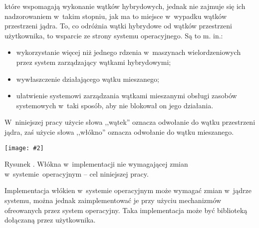 \documentclass[12pt]{mwart}
\newcounter{figmain}
\newcommand{\myownfigure}[4]{ \newcounter{#1} \setcounter{#1}{\value{figmain}} \addtocounter{figmain}{1} \begin{center} \label{fig:#1} \centering \texttt{[image: \#2]}\\ \nopagebreak[5] \parbox[t]{11.5cm}{Rysunek \arabic{#1}. #3.} \end{center}}
\begin{document}
  które wspomagają wykonanie wątków hybrydowych, jednak nie zajmuje się ich nadzorowaniem w~takim stopniu, jak ma to miejsce w~wypadku
  wątków przestrzeni jądra. To, co odróżnia wątki hybrydowe od wątków przestrzeni użytkownika, to wsparcie ze strony systemu operacyjnego.
  Są to m. in.:
  \begin{itemize}
    \item wykorzystanie więcej niż jednego rdzenia w~maszynach wielordzeniowych przez system zarządzający wątkami hybrydowymi;
    \item wywłaszczenie działającego wątku mieszanego;
    \item ułatwienie systemowi zarządzania wątkami mieszanymi obsługi zasobów systemowych w~taki sposób, aby nie blokował on jego działania.
  \end{itemize}
\par
%
\indent
  W~niniejszej pracy użycie słowa ,,wątek'' oznacza odwołanie do wątku przestrzeni jądra, zaś użycie słowa ,,włókno'' oznacza odwołanie
  do wątku mieszanego.
\par
%
\indent
  \myownfigure{mixedintro}{mixedscheme.png}{Włókna w~implementacji nie wymagającej zmian w~systemie~operacyjnym -- cel niniejszej pracy}{.23}
\par
\indent
  Implementacja włókien w~systemie operacyjnym może wymagać zmian w~jądrze systemu,
  można jednak zaimplementować je przy użyciu mechanizmów ofreowanych przez system operacyjny.
  Taka implementacja może być biblioteką dołączaną przez użytkownika.
\par
%
\end{document}
